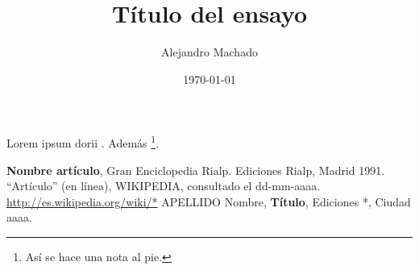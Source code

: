 \documentclass[letterpaper,12pt]{article}
\begin{document}
\title{Título del ensayo}
\author{\normalsize{Alejandro Machado}}
\date{\normalsize{\today}}
\maketitle

\thispagestyle{empty}
\pagestyle{empty}

Lorem ipsum dorii \cite{rialp}. Además \footnote{Así se hace una nota al pie.}.

\Blindtext

\begin{thebibliography}{}
        \textbf{Nombre artículo}, Gran Enciclopedia Rialp. Ediciones Rialp,
        Madrid 1991.
        ``Artículo'' (en línea), WIKIPEDIA, consultado el dd-mm-aaaa. \\
        \url{http://es.wikipedia.org/wiki/*}
        APELLIDO Nombre, \textbf{Título}, Ediciones *, Ciudad aaaa.
\end{thebibliography}
\end{document}
